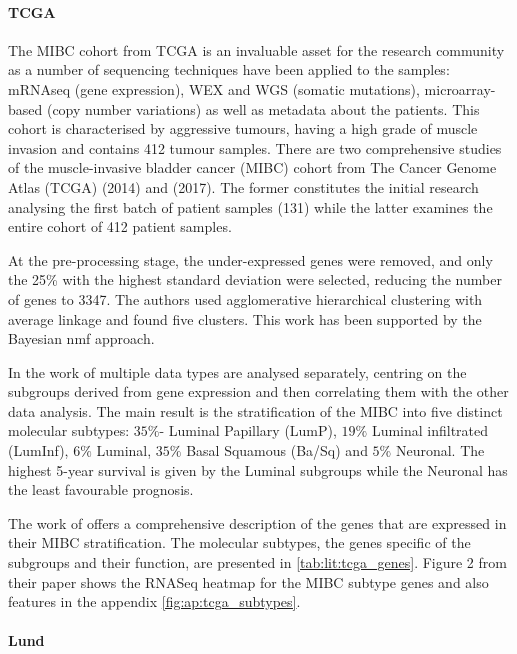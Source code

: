 \paragraph*{TCGA} \label{s:lit:tcga_mibc}

The MIBC cohort from TCGA is an invaluable asset for the research community as a number of sequencing techniques have been applied to the samples: mRNAseq (gene expression), WEX and WGS (somatic mutations), microarray-based (copy number variations) as well as metadata about the patients. This cohort is characterised by aggressive tumours, having a high grade of muscle invasion and contains 412 tumour samples. There are two comprehensive studies of the muscle-invasive bladder cancer (MIBC) cohort from The Cancer Genome Atlas (TCGA) \citet{Tcga2014-dr} (2014) and \citet{Robertson2017-mg} (2017). The former constitutes the initial research analysing the first batch of patient samples (131) while the latter examines the entire cohort of 412 patient samples. 

At the pre-processing stage, the under-expressed genes were removed, and only the 25\% with the highest standard deviation were selected, reducing the number of genes to 3347. The authors used agglomerative hierarchical clustering with average linkage and found five clusters. This work has been supported by the Bayesian \acrfull{nmf} \cite{Schmidt2009-zh} approach.

In the work of \citet{Robertson2017-mg} multiple data types are analysed separately, centring on the subgroups derived from gene expression and then correlating them with the other data analysis. The main result is the stratification of the MIBC into five distinct molecular subtypes: $35\%$- Luminal Papillary (LumP), $19\%$ Luminal infiltrated (LumInf), $6\%$ Luminal, $35\%$ Basal Squamous (Ba/Sq) and $5\%$ Neuronal. The highest 5-year survival is given by the Luminal subgroups while the Neuronal has the least favourable prognosis. 

 The work of \citet{Robertson2017-mg} offers a comprehensive description of the genes that are expressed in their MIBC stratification. The molecular subtypes, the genes specific of the subgroups and their function, are presented in \cref{tab:lit:tcga_genes}. Figure 2 from their paper shows the RNASeq heatmap for the MIBC subtype genes and also features in the appendix \cref{fig:ap:tcga_subtypes}.

\paragraph*{Lund} \label{s:lit:lund_mibc}

